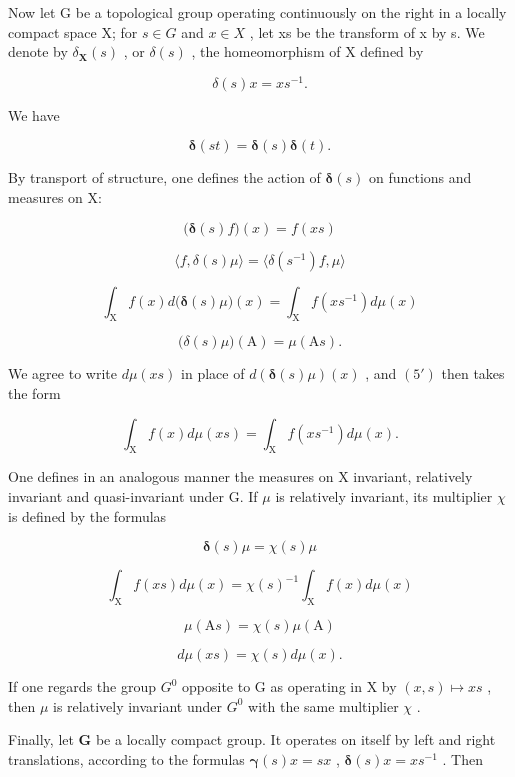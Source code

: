 Now let G be a topological group operating continuously on the right in a locally compact space X; for \(s \in G\) and \(x \in X\) , let xs be the transform of x by s. We denote by \(\delta_{\mathbf{X}}(s)\) , or \(\delta(s)\) , the homeomorphism of X defined by

\[
\delta (s) x = x s ^ {- 1}.\tag{1'}
\]

We have

\[
\boldsymbol {\delta} (s t) = \boldsymbol {\delta} (s) \boldsymbol {\delta} (t).\tag{2'}
\]

By transport of structure, one defines the action of \(\boldsymbol{\delta}(s)\) on functions and measures on X:



\[
\big (\boldsymbol {\delta} (s) f \big) (x) = f (x s)\tag{3'}
\]

\[
\langle f, \delta (s) \mu \rangle = \langle \delta (s ^ {- 1}) f, \mu \rangle\tag{4'}
\]

\[
\int_ {\mathrm{X}} f (x) d \bigl (\pmb {\delta} (s) \mu \bigr) (x) = \int_ {\mathrm{X}} f (x s ^ {- 1}) d \mu (x)\tag{5'}
\]

\[
\big (\delta (s) \mu \big) (\mathrm{A}) = \mu (\mathrm{A} s).\tag{6'}
\]

We agree to write \(d\mu(xs)\) in place of \(d(\pmb{\delta}(s)\mu)(x)\) , and \((5')\) then takes the form

\[
\int_ {\mathrm{X}} f (x) d \mu (x s) = \int_ {\mathrm{X}} f (x s ^ {- 1}) d \mu (x).
\]

One defines in an analogous manner the measures on X invariant, relatively invariant and quasi-invariant under G. If \(\mu\) is relatively invariant, its multiplier \(\chi\) is defined by the formulas



\[
\boldsymbol {\delta} (s) \mu = \chi (s) \mu\tag{7'}
\]

\[
\int_ {\mathrm{X}} f (x s) d \mu (x) = \chi (s) ^ {- 1} \int_ {\mathrm{X}} f (x) d \mu (x)\tag{8'}
\]

\[
\mu (\mathrm{A} s) = \chi (s) \mu (\mathrm{A})\tag{9'}
\]

\[
d \mu (x s) = \chi (s) d \mu (x).\tag{10'}
\]

If one regards the group \(G^{0}\) opposite to G as operating in X by \((x, s) \mapsto xs\) , then \(\mu\) is relatively invariant under \(G^{0}\) with the same multiplier \(\chi\) .

Finally, let \(\mathbf{G}\) be a locally compact group. It operates on itself by left and right translations, according to the formulas \(\pmb{\gamma}(s)x = sx\) , \(\pmb{\delta}(s)x = xs^{-1}\) . Then

